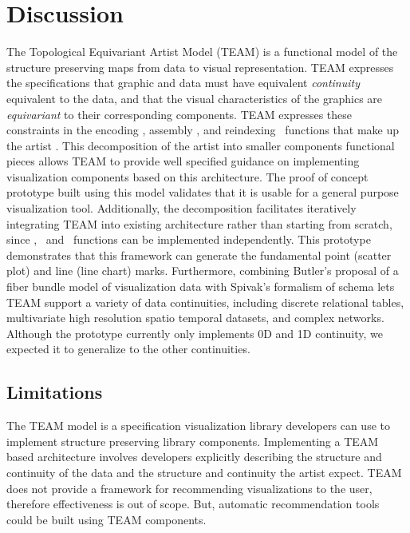 \documentclass[../main.tex]{subfiles}
\begin{document}
\section{Discussion}
The Topological Equivariant Artist Model (TEAM) is a functional model of the structure preserving maps from data to visual representation. TEAM expresses the specifications that graphic and data must have equivalent \textit{continuity} equivalent to the data, and that the visual characteristics of the graphics are \textit{equivariant} to their corresponding components. TEAM expresses these constraints in the encoding \vchannel, assembly \vmark, and reindexing \vindex\ functions that make up the artist \vartist. This decomposition of the artist into smaller components functional pieces allows TEAM to provide well specified guidance on implementing visualization components based on this architecture. The proof of concept prototype built using this model validates that it is usable for a general purpose visualization tool. Additionally, the decomposition facilitates iteratively integrating TEAM into existing architecture rather than starting from scratch, since \vchannel, \vmark\ and \vindex\ functions can be implemented independently. This prototype demonstrates that this framework can generate the fundamental point (scatter plot) and line (line chart) marks. Furthermore, combining Butler's proposal of a fiber bundle model of visualization data with Spivak's formalism of schema lets TEAM support a variety of data continuities, including  discrete relational tables, multivariate high resolution spatio temporal datasets, and complex networks. Although the prototype currently only implements 0D and 1D continuity, we expected it to generalize to the other continuities. 

\subsection{Limitations}
The TEAM model is a specification visualization library developers can use to implement structure preserving library components. Implementing a TEAM based architecture involves developers explicitly describing the structure and continuity of the data and the structure and continuity the artist expect. TEAM does not provide a framework for recommending visualizations to the user,  therefore effectiveness \cite{mackinlayAutomaticDesignGraphical1987,chambersGraphicalMethodsData1983a} is out of scope. But, automatic recommendation tools could be built using TEAM components. 
\end{document}
